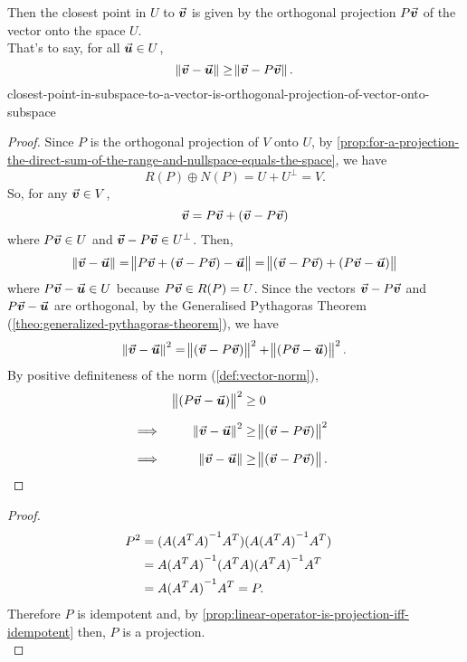 \documentclass[../MathsNotesBase.tex]{subfiles}
\begin{document}
{{	Then the closest point in $U$ to $\vec{\bm{v}}$ is given by the orthogonal projection $P\vec{\bm{v}}$ of the vector onto the space $U$.\\
		
	That's to say, for all ${ \vec{\bm{u}} \in U }$,
		\[ \norm{\vec{\bm{v}} - \vec{\bm{u}}} \geq \norm{\vec{\bm{v}} - P\vec{\bm{v}}}. \]
	}{closest-point-in-subspace-to-a-vector-is-orthogonal-projection-of-vector-onto-subspace}
	\begin{proof}
		Since $P$ is the orthogonal projection of $V$ onto $U$, by \autoref{prop:for-a-projection-the-direct-sum-of-the-range-and-nullspace-equals-the-space}, we have
		\[ R(P) \oplus N(P) = U + U^\perp = V. \]
		So, for any ${ \vec{\bm{v}} \in V }$,
		\[ \vec{\bm{v}} = P\vec{\bm{v}} + (\vec{\bm{v}} - P\vec{\bm{v}}) \]
		where ${ P\vec{\bm{v}} \in U }$ and ${ \vec{\bm{v}} - P\vec{\bm{v}} \in U^\perp }$. 
		Then,
		\[ \norm{\vec{\bm{v}} - \vec{\bm{u}}} = \norm{P\vec{\bm{v}} + (\vec{\bm{v}} - P\vec{\bm{v}}) - \vec{\bm{u}}} = \norm{(\vec{\bm{v}} - P\vec{\bm{v}}) + (P\vec{\bm{v}} - \vec{\bm{u}})}  \]
		where ${ P\vec{\bm{v}} - \vec{\bm{u}} \in U }$ because ${ P\vec{\bm{v}} \in R(P) = U }$. Since the vectors ${ \vec{\bm{v}} - P\vec{\bm{v}} }$ and ${ P\vec{\bm{v}} - \vec{\bm{u}} }$ are orthogonal, by the Generalised Pythagoras Theorem (\autoref{theo:generalized-pythagoras-theorem}), we have
		\[ \norm{\vec{\bm{v}} - \vec{\bm{u}}}^2 = \norm{(\vec{\bm{v}} - P\vec{\bm{v}})}^2 + \norm{(P\vec{\bm{v}} - \vec{\bm{u}})}^2. \]
		By positive definiteness of the norm (\ref{def:vector-norm}),
		\[\begin{aligned}
			&&\norm{(P\v - \u)}^2 &\geq 0 \nn
			&\implies & \norm{\v - \u}^2 &\geq \norm{(\v - P\v)}^2 &\sidecomment{} \nn
			&\implies & \norm{\v - \u} &\geq \norm{(\v - P\v)}.  \qedhere
		\end{aligned}\]
	\end{proof}


	\bigskip
	\begin{proof}
		\[\begin{aligned}
			P^2 &= (A {(A^T A)}^{-1} A^T) (A {(A^T A)}^{-1} A^T) \\
			&= A {(A^T A)}^{-1} (A^T A) {(A^T A)}^{-1} A^T &\text{\scriptsize{}} \\
			&= A {(A^T A)}^{-1} A^T = P.
		\end{aligned}\]
		Therefore $P$ is idempotent and, by \autoref{prop:linear-operator-is-projection-iff-idempotent} then, $P$ is a projection.\\
		

\end{proof}}
\end{document}
